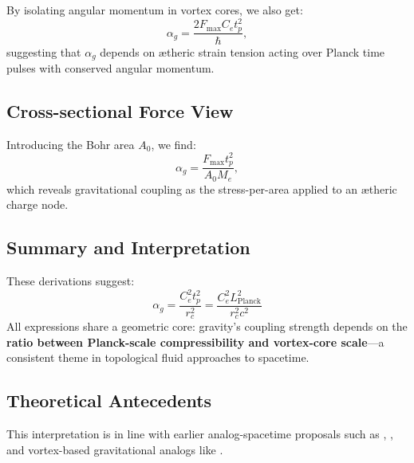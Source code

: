 By isolating angular momentum in vortex cores, we also get:
\[
    \alpha_g = \frac{2 F_{\text{max}} C_e t_p^2}{\hbar},
\]
suggesting that $\alpha_g$ depends on ætheric strain tension acting over Planck time pulses with conserved angular momentum.

\subsection*{Cross-sectional Force View}

Introducing the Bohr area $A_0$, we find:
\[
    \alpha_g = \frac{F_{\text{max}} t_p^2}{A_0 M_e},
\]
which reveals gravitational coupling as the stress-per-area applied to an ætheric charge node.

\subsection*{Summary and Interpretation}

These derivations suggest:
\[
    \boxed{
        \alpha_g = \frac{C_e^2 t_p^2}{r_c^2} = \frac{C_e^2 L_{\text{Planck}}^2}{r_c^2 c^2}
    }
\]
All expressions share a geometric core: gravity’s coupling strength depends on the \textbf{ratio between Planck-scale compressibility and vortex-core scale}—a consistent theme in topological fluid approaches to spacetime.

\subsection*{Theoretical Antecedents}

This interpretation is in line with earlier analog-spacetime proposals such as \cite{barcelo2011}, \cite{volovik2003universe}, and vortex-based gravitational analogs like \cite{ranada1989topological}.
